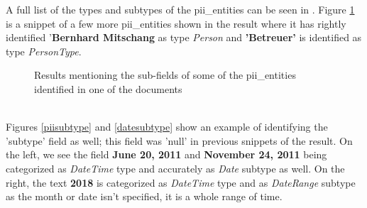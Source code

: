 \newpage
A full list of the types and subtypes of the pii\_entities can be seen in \cite{azurepiicategories}. Figure \ref{query2results} is a snippet of a few more pii\_entities shown in the result where it has rightly identified '\textbf{Bernhard Mitschang} as type \textit{Person} and \textbf{'Betreuer'} is identified as type \textit{PersonType}. 
\begin {figure}[h!h]
    \centering
    \caption{Results mentioning the sub-fields of some of the pii\_entities identified in one of the documents}
    \label{query2results}
\end {figure}
\\
Figures \ref{piisubtype} and \ref{datesubtype} show an example of identifying the 'subtype' field as well; this field was 'null' in previous snippets of the result. On the left, we see the field \textbf{June 20, 2011} and \textbf{November 24, 2011} being categorized as \textit{DateTime} type and accurately as \textit{Date} subtype as well. On the right, the text \textbf{2018} is categorized as \textit{DateTime} type and as \textit{DateRange} subtype as the month or date isn't specified, it is a whole range of time. \\
